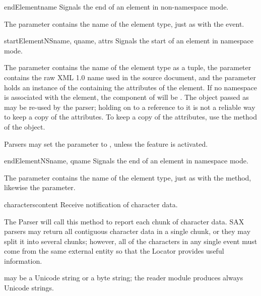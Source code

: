 \begin{methoddesc}[ContentHandler]{endElement}{name}
  Signals the end of an element in non-namespace mode.

  The  parameter contains the name of the element type, just
  as with the  event.
\end{methoddesc}

\begin{methoddesc}[ContentHandler]{startElementNS}{name, qname, attrs}
  Signals the start of an element in namespace mode.

  The  parameter contains the name of the element type as a
   tuple, the  parameter
  contains the raw XML 1.0 name used in the source document, and the
   parameter holds an instance of the
  containing the attributes of the element.  If no namespace is
  associated with the element, the  component of 
  will be .  The object passed as  may be
  re-used by the parser; holding on to a reference to it is not a
  reliable way to keep a copy of the attributes.  To keep a copy of
  the attributes, use the  method of the 
  object.

  Parsers may set the  parameter to , unless the
   feature is activated.
\end{methoddesc}

\begin{methoddesc}[ContentHandler]{endElementNS}{name, qname}
  Signals the end of an element in namespace mode.

  The  parameter contains the name of the element type, just
  as with the  method, likewise the
   parameter.
\end{methoddesc}

\begin{methoddesc}[ContentHandler]{characters}{content}
  Receive notification of character data.
        
  The Parser will call this method to report each chunk of character
  data. SAX parsers may return all contiguous character data in a
  single chunk, or they may split it into several chunks; however, all
  of the characters in any single event must come from the same
  external entity so that the Locator provides useful information.

   may be a Unicode string or a byte string; the
   reader module produces always Unicode strings.

\end{methoddesc}

